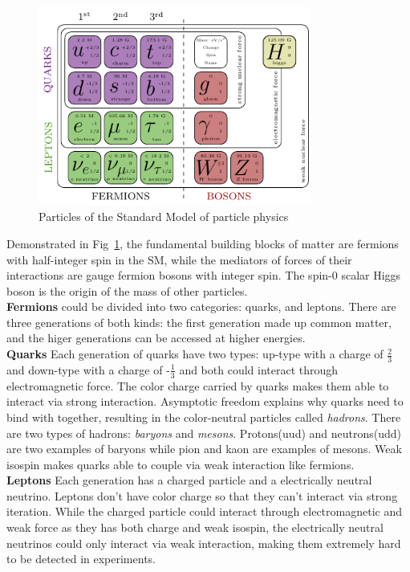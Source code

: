 \begin{figure}[htbp]
  \begin{center}
    \includegraphics[width=0.8\textwidth]{chapters/c1/figures/sm-particle-table}
  \end{center}
  \caption{Particles of the Standard Model of particle physics}
  \label{fig:c1smparticletable}
\end{figure}
Demonstrated in Fig~\ref{fig:c1smparticletable},
the fundamental building blocks of matter are fermions with half-integer spin in the SM, while the mediators of forces of their interactions are gauge fermion bosons with integer spin.
The spin-0 scalar Higgs boson is the origin of the mass of other particles.\\
\textbf{Fermions} could be divided into two categories: quarks, and leptons. There are three generations of both kinds: the first generation made up common matter, and the higer generations can be accessed at higher energies.\\
\textbf{Quarks} 	 Each generation of quarks have two types: up-type with a charge of $\frac{2}{3}$ and down-type with a charge of -$\frac{1}{3}$ and both could interact through electromagnetic force. The color charge carried by quarks makes them able to 
interact via strong interaction. Asymptotic freedom explains why quarks need to bind with together, resulting in the color-neutral particles called \textit{hadrons}. There are two types of hadrons: \textit{baryons} and \textit{mesons}. Protons(uud) and neutrons(udd) are two examples of baryons while pion and kaon are examples of mesons. Weak isospin makes quarks able to couple via weak interaction like fermions.\\
\textbf{Leptons} Each generation has a charged particle and a electrically neutral neutrino. Leptons don't have color charge so that they can't interact via strong iteration. While the charged particle could interact through electromagnetic and weak force as they has both charge and weak isospin, the electrically neutral neutrinos could only interact via weak interaction, making them extremely hard to be detected in experiments.\\
